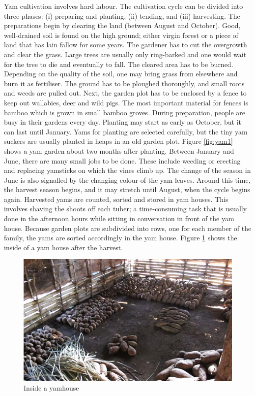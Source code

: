 Yam cultivation involves hard labour. The cultivation cycle can be divided into three phases: (i) preparing and planting, (ii) tending, and (iii) harvesting. The preparations begin by clearing the land (between August and October). Good, well-drained soil is found on the high ground; either virgin forest or a piece of land that has lain fallow for some years. The gardener has to cut the overgrowth and clear the grass. Large trees are usually only ring-barked and one would wait for the tree to die and eventually to fall. The cleared area has to be burned. Depending on the quality of the soil, one may bring grass from elsewhere and burn it as fertiliser. The ground has to be ploughed thoroughly, and small roots and weeds are pulled out. Next, the garden plot has to be enclosed by a fence to keep out wallabies, deer and wild pigs. The most important material for fences is bamboo which is grown in small bamboo groves. During preparation, people are busy in their gardens every day. Planting may start as early as October, but it can last until January. Yams for planting are selected carefully, but the tiny yam suckers are usually planted in heaps in an old garden plot. Figure \ref{fig:yam1} shows a yam garden about two months after planting. Between January and June, there are many small jobs to be done. These include weeding or erecting and replacing yamsticks on which the vines climb up. The change of the season in June is also signalled by the changing colour of the yam leaves. Around this time, the harvest season begins, and it may stretch until August, when the cycle begins again. Harvested yams are counted, sorted and stored in yam houses. This involves shaving the shoots off each tuber; a time-consuming task that is usually done in the afternoon hours while sitting in conversation in front of the yam house. Because garden plots are subdivided into rows, one for each member of the family, the yams are sorted accordingly in the yam house. Figure \ref{fig:yam2} shows the inside of a yam house after the harvest.

\begin{figure}
    \includegraphics[width=.9\textwidth]{figures/yam2.jpg}
  \caption[Inside a yamhouse]{Inside a yamhouse}
  \label{fig:yam2}
\end{figure}%

